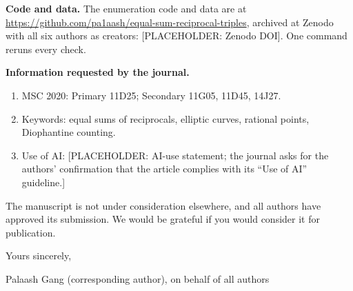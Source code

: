 \documentclass[11pt]{article}
\begin{document}
\textbf{Code and data.} The enumeration code and data are at \url{https://github.com/pa1aash/equal-sum-reciprocal-triples}, archived at Zenodo with all six authors as creators: [PLACEHOLDER: Zenodo DOI]. One command reruns every check.

\textbf{Information requested by the journal.}
\begin{enumerate}\setlength{\itemsep}{2pt}
\item[(i)] MSC 2020: Primary 11D25; Secondary 11G05, 11D45, 14J27.
\item[(ii)] Keywords: equal sums of reciprocals, elliptic curves, rational points, Diophantine counting.
\item[(iii)] Use of AI: [PLACEHOLDER: AI-use statement; the journal asks for the authors' confirmation that the article complies with its ``Use of AI'' guideline.]
\end{enumerate}

The manuscript is not under consideration elsewhere, and all authors have approved its submission. We would be grateful if you would consider it for publication.

Yours sincerely,

\vspace{10mm}
Palaash Gang (corresponding author), on behalf of all authors
\end{document}
